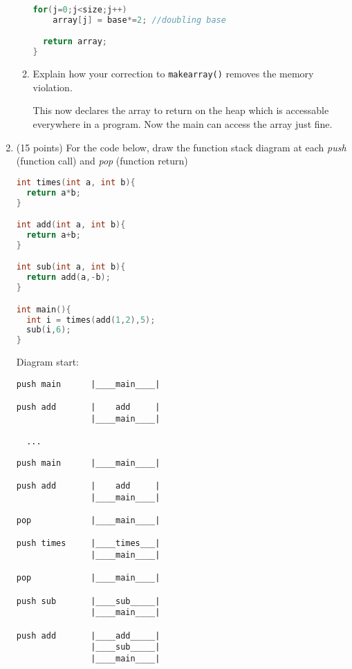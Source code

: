 \documentclass{article}[9pt]
\newenvironment{answerfont}{\fontfamily{qhv}\selectfont}{\par}
\newenvironment{myanswer}{\begin{mdframed}\begin{answerfont}}{\end{answerfont}\end{mdframed}}
\begin{document}
\begin{enumerate}
\begin{enumerate}
\begin{myanswer}
\begin{lstlisting}[language=c]
  for(j=0;j<size;j++)
    array[j] = base*=2; //doubling base

  return array;
}
\end{lstlisting}
\end{myanswer}


\item Explain how your correction to \texttt{makearray()} removes the memory violation.

\begin{myanswer}
This now declares the array to return on the heap which is accessable
everywhere in a program.  Now the main can access the array just fine.
\end{myanswer}


\end{enumerate}

\item (15 points) For the code below, draw the function stack diagram at each
\emph{push} (function call) and \emph{pop} (function return)

\begin{lstlisting}[language=c]
int times(int a, int b){
  return a*b;
}

int add(int a, int b){
  return a+b;
}

int sub(int a, int b){
  return add(a,-b);
}

int main(){
  int i = times(add(1,2),5);
  sub(i,6);
}
\end{lstlisting}

Diagram start:

\begin{lstlisting}
push main      |____main____|

push add       |    add     |
               |____main____|

  ...
\end{lstlisting}

\begin{myanswer}
\begin{lstlisting}
push main      |____main____|

push add       |    add     |
               |____main____|

pop            |____main____|

push times     |____times___|
               |____main____|

pop            |____main____|

push sub       |____sub_____|
               |____main____|

push add       |____add_____|
               |____sub_____|
               |____main____|


\end{lstlisting}
\end{myanswer}
\end{enumerate}
\end{document}
